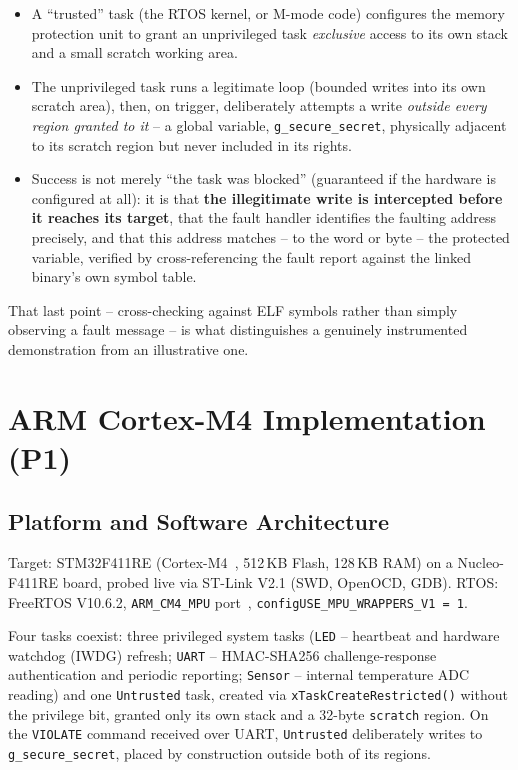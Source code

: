 \documentclass[sigconf,nonacm]{acmart}
\begin{document}
\begin{itemize}
  \item A ``trusted'' task (the RTOS kernel, or M-mode code) configures the memory protection unit to grant an unprivileged task \emph{exclusive} access to its own stack and a small scratch working area.
  \item The unprivileged task runs a legitimate loop (bounded writes into its own scratch area), then, on trigger, deliberately attempts a write \emph{outside every region granted to it} -- a global variable, \texttt{g\_secure\_secret}, physically adjacent to its scratch region but never included in its rights.
  \item Success is not merely ``the task was blocked'' (guaranteed if the hardware is configured at all): it is that \textbf{the illegitimate write is intercepted before it reaches its target}, that the fault handler identifies the faulting address precisely, and that this address matches -- to the word or byte -- the protected variable, verified by cross-referencing the fault report against the linked binary's own symbol table.
\end{itemize}

That last point -- cross-checking against ELF symbols rather than simply observing a fault message -- is what distinguishes a genuinely instrumented demonstration from an illustrative one.

\section{ARM Cortex-M4 Implementation (P1)}
\label{sec:p1}

\subsection{Platform and Software Architecture}

Target: STM32F411RE (Cortex-M4~\cite{arm-armv7m}, 512\,KB Flash, 128\,KB RAM) on a Nucleo-F411RE board, probed live via ST-Link V2.1 (SWD, OpenOCD, GDB). RTOS: FreeRTOS V10.6.2, \texttt{ARM\_CM4\_MPU} port~\cite{freertos-mpu}, \texttt{configUSE\_MPU\_WRAPPERS\_V1 = 1}.

Four tasks coexist: three privileged system tasks (\texttt{LED} -- heartbeat and hardware watchdog (IWDG) refresh; \texttt{UART} -- HMAC-SHA256 challenge-response authentication and periodic reporting; \texttt{Sensor} -- internal temperature ADC reading) and one \texttt{Untrusted} task, created via \texttt{xTaskCreateRestricted()} without the privilege bit, granted only its own stack and a 32-byte \texttt{scratch} region. On the \texttt{VIOLATE} command received over UART, \texttt{Untrusted} deliberately writes to \texttt{g\_secure\_secret}, placed by construction outside both of its regions.
\end{document}
